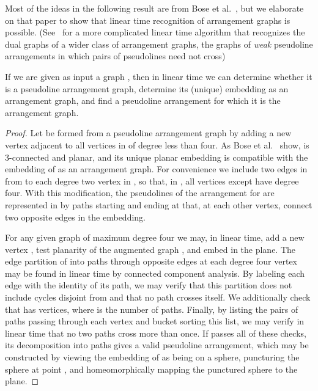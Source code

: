 \documentclass[oribibl]{llncs}
\begin{document}
Most of the ideas in the following result are from Bose et al.~\cite{BosEveWis-IJCGA-03},
but we elaborate on that paper to show that linear time recognition of arrangement graphs is possible. (See~\cite{Epp-GD-04} for a more complicated linear time algorithm that recognizes the dual graphs of a wider class of arrangement graphs, the graphs of \emph{weak} pseudoline arrangements in which pairs of pseudolines need not cross)

\begin{lemma}
\label{lem:test-arrangement}
If we are given as input a graph , then in linear time we can determine whether it is a pseudoline arrangement graph, determine its (unique) embedding as an arrangement graph, and find a pseudoline arrangement for which it is the arrangement graph.
\end{lemma}

\begin{proof}
Let  be formed from a pseudoline arrangement graph  by adding a new vertex  adjacent to all vertices in  of degree less than four. As Bose et al.~\cite{BosEveWis-IJCGA-03} show,  is 3-connected and planar, and its unique planar embedding is compatible with the embedding of  as an arrangement graph. For convenience we include two edges in  from  to each degree two vertex in , so that, in , all vertices except  have degree four. With this modification, the pseudolines of the arrangement for  are represented in  by paths starting and ending at  that, at each other vertex, connect two opposite edges in the embedding.

For any given graph  of maximum degree four we may, in linear time, add a new vertex , test planarity of the augmented graph , and embed  in the plane. The edge partition of  into paths through opposite edges at each degree four vertex may be found in linear time by connected component analysis. By labeling each edge with the identity of its path, we may verify that this partition does not include cycles disjoint from  and that no path crosses itself. We additionally check that  has  vertices, where  is the number of paths. Finally, by listing the pairs of paths passing through each vertex and bucket sorting this list, we may verify in linear time that no two paths cross more than once. If  passes all of these checks, its decomposition into paths gives a valid pseudoline arrangement, which may be constructed by viewing the embedding of  as being on a sphere, puncturing the sphere at point , and homeomorphically mapping the punctured sphere to the plane. 
\end{proof}
\end{document}
